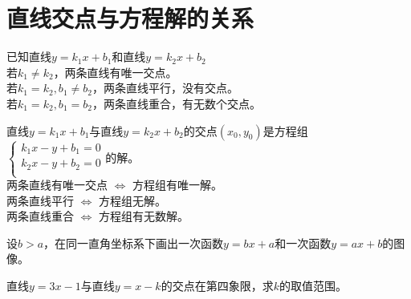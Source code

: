 \section{直线交点与方程解的关系}
\begin{theorem}
    已知直线$y=k_1x+b_1$和直线$y=k_2x+b_2$ \\
    若$k_1\ne k_2$，两条直线有唯一交点。 \\
    若$k_1 = k_2, b_1 \ne b_2$，两条直线平行，没有交点。 \\
    若$k_1 = k_2, b_1 = b_2$，两条直线重合，有无数个交点。
\end{theorem}
\begin{theorem}
    直线$y=k_1x+b_1$与直线$y=k_2x+b_2$的交点$(x_0,y_0)$是方程组 \\
    $\begin{cases} k_1x-y+b_1=0  \\ k_2x-y+b_2=0  \\ \end{cases}$的解。\\
    两条直线有唯一交点 $\Leftrightarrow$ 方程组有唯一解。 \\
    两条直线平行 $\Leftrightarrow$ 方程组无解。 \\
    两条直线重合 $\Leftrightarrow$ 方程组有无数解。
\end{theorem}
\begin{problem}
设$b>a$，在同一直角坐标系下画出一次函数$y=bx+a$和一次函数$y=ax+b$的图像。\\
\end{problem}
\begin{problem}
直线$y=3x-1$与直线$y=x-k$的交点在第四象限，求$k$的取值范围。\\
\end{problem}
\clearpage
